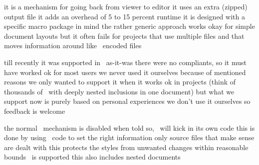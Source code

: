 


\definecolor[maincolor][r=.6]

\startdocument[title=\SYNCTEX,subtitle={\CONTEXT\ 2017 Maibach}]

\startchapter[title=What is \SYNCTEX]

\startitemize
    \startitem it is a mechanism for going back from viewer to editor \stopitem
    \startitem it uses an extra (zipped) output file \stopitem
    \startitem it adds an overhead of 5 to 15 percent runtime \stopitem
    \startitem it is designed with a specific macro package in mind \stopitem
    \startitem the rather generic approach works okay for simple document layouts \stopitem
    \startitem but it often fails for projects that use multiple files\stopitem
    \startitem and that moves information around like \XML\ encoded files \stopitem
\stopitemize

\startchapter[title=Disclaimer]

\startitemize
    \startitem till recently it was supported in \CONTEXT\ as-it-was  \stopitem
    \startitem there were no compliants, so it must have worked ok for most users \stopitem
    \startitem we never used it ourselves because of mentioned reasons \stopitem
    \startitem we only wanted to support it when it works ok in projects \stopitem
    \startitem (think of thousands of \XML\ with deeply nested inclusions in one document) \stopitem
    \startitem but what we support now is purely based on personal experiences \stopitem
    \startitem we don't use it ourselves so feedback is welcome \stopitem
\stopitemize

\stopchapter

\startchapter[title=What we do]

\startitemize
    \startitem the normal \SYNCTEX\ mechanism is disabled \stopitem
    \startitem when told so, \CONTEXT\ will kick in its own code \stopitem
    \startitem this is done by using \LUA\ code to set the right information \stopitem
    \startitem only source files that make sense are dealt with \stopitem
    \startitem this protects the styles from unwanted changes \stopitem
    \startitem within reasonable bounds \XML\ is supported \stopitem
    \startitem this also includes nested documents \stopitem
\stopitemize

\stopchapter

